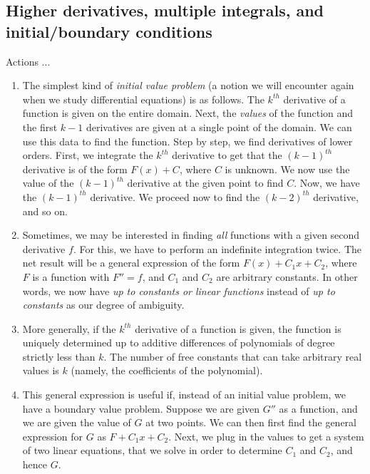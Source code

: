 \documentclass[10pt]{amsart}
\begin{document}
\subsection{Higher derivatives, multiple integrals, and initial/boundary conditions}

Actions ...

\begin{enumerate}
\item The simplest kind of {\em initial value problem} (a notion we
  will encounter again when we study differential equations) is as
  follows. The $k^{th}$ derivative of a function is given on the
  entire domain. Next, the {\em values} of the function and the first
  $k - 1$ derivatives are given at a single point of the domain. We
  can use this data to find the function. Step by step, we find
  derivatives of lower orders. First, we integrate the $k^{th}$
  derivative to get that the $(k-1)^{th}$ derivative is of the form
  $F(x) + C$, where $C$ is unknown. We now use the value of the
  $(k-1)^{th}$ derivative at the given point to find $C$. Now, we have
  the $(k-1)^{th}$ derivative. We proceed now to find the $(k-2)^{th}$
  derivative, and so on.
\item Sometimes, we may be interested in finding {\em all} functions
  with a given second derivative $f$. For this, we have to perform an
  indefinite integration twice. The net result will be a general
  expression of the form $F(x) + C_1x + C_2$, where $F$ is a function
  with $F'' = f$, and $C_1$ and $C_2$ are arbitrary constants. In
  other words, we now have {\em up to constants or linear functions}
  instead of {\em up to constants} as our degree of ambiguity.
\item More generally, if the $k^{th}$ derivative of a function is
  given, the function is uniquely determined up to additive
  differences of polynomials of degree strictly less than $k$. The
  number of free constants that can take arbitrary real values is $k$
  (namely, the coefficients of the polynomial).
\item This general expression is useful if, instead of an initial
  value problem, we have a boundary value problem. Suppose we are
  given $G''$ as a function, and we are given the value of $G$ at two
  points. We can then first find the general expression for $G$ as $F
  + C_1x + C_2$. Next, we plug in the values to get a system of two
  linear equations, that we solve in order to determine $C_1$ and
  $C_2$, and hence $G$.
\end{enumerate}
\end{document}
